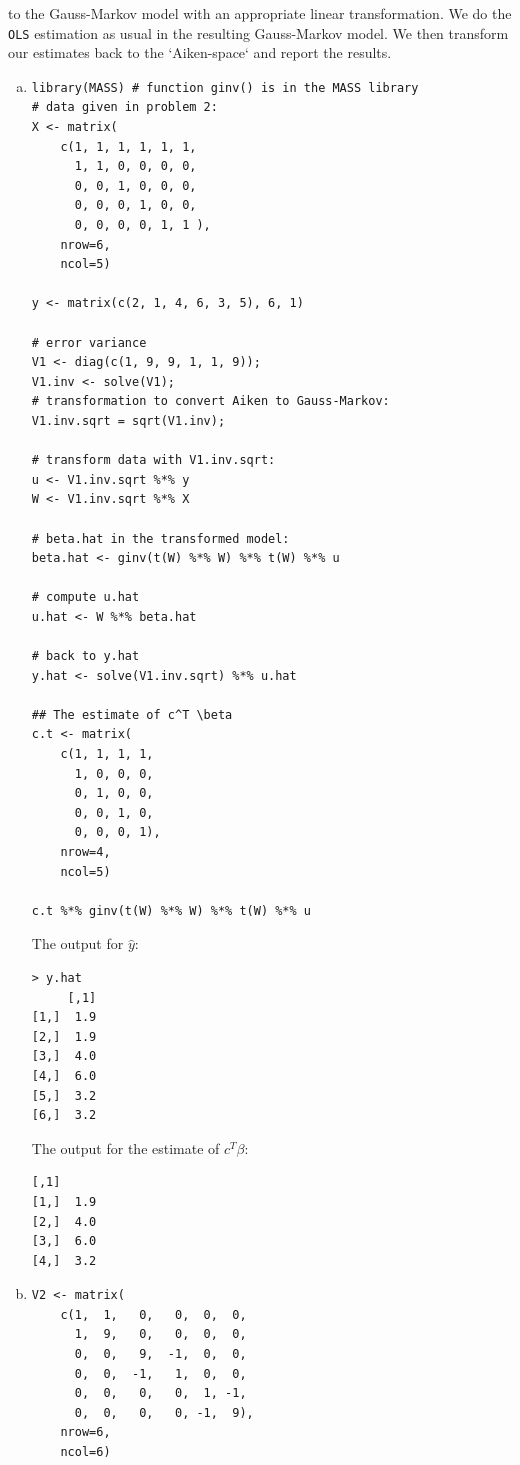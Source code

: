 \documentclass[paper=a4, fontsize=11pt]{scrartcl} %
\begin{document}
to the Gauss-Markov model with an appropriate linear transformation. We do the \texttt{OLS} estimation
as usual in the resulting Gauss-Markov model. We then transform our estimates back to the `Aiken-space` and report the results. 
\pagebreak
\begin{enumerate}[(a)]
\item 
\begin{lstlisting}[basicstyle=\ttfamily\small\bfseries]
library(MASS) # function ginv() is in the MASS library
# data given in problem 2:
X <- matrix( 
    c(1, 1, 1, 1, 1, 1, 
      1, 1, 0, 0, 0, 0,
      0, 0, 1, 0, 0, 0,
      0, 0, 0, 1, 0, 0, 
      0, 0, 0, 0, 1, 1 ), 
    nrow=6, 
    ncol=5) 

y <- matrix(c(2, 1, 4, 6, 3, 5), 6, 1)

# error variance 
V1 <- diag(c(1, 9, 9, 1, 1, 9));
V1.inv <- solve(V1);
# transformation to convert Aiken to Gauss-Markov:
V1.inv.sqrt = sqrt(V1.inv);

# transform data with V1.inv.sqrt:
u <- V1.inv.sqrt %*% y
W <- V1.inv.sqrt %*% X

# beta.hat in the transformed model:
beta.hat <- ginv(t(W) %*% W) %*% t(W) %*% u

# compute u.hat
u.hat <- W %*% beta.hat

# back to y.hat
y.hat <- solve(V1.inv.sqrt) %*% u.hat

## The estimate of c^T \beta
c.t <- matrix( 
    c(1, 1, 1, 1, 
      1, 0, 0, 0,
      0, 1, 0, 0,
      0, 0, 1, 0,
      0, 0, 0, 1), 
    nrow=4, 
    ncol=5) 

c.t %*% ginv(t(W) %*% W) %*% t(W) %*% u

\end{lstlisting}

\pagebreak
The output for $\hat y$:
\begin{lstlisting}[basicstyle=\ttfamily\small\bfseries]
> y.hat
     [,1]
[1,]  1.9
[2,]  1.9
[3,]  4.0
[4,]  6.0
[5,]  3.2
[6,]  3.2
\end{lstlisting}

The output for the estimate of $ c^T  \beta $:
\begin{lstlisting}[basicstyle=\ttfamily\small\bfseries]
     [,1]
[1,]  1.9
[2,]  4.0
[3,]  6.0
[4,]  3.2
\end{lstlisting}



\item 

\begin{lstlisting}[basicstyle=\ttfamily\small\bfseries]
V2 <- matrix( 
    c(1,  1,   0,   0,  0,  0,
      1,  9,   0,   0,  0,  0,
      0,  0,   9,  -1,  0,  0,
      0,  0,  -1,   1,  0,  0,
      0,  0,   0,   0,  1, -1,
      0,  0,   0,   0, -1,  9),
    nrow=6, 
    ncol=6) 


\end{lstlisting}
\end{enumerate}
\end{document}
